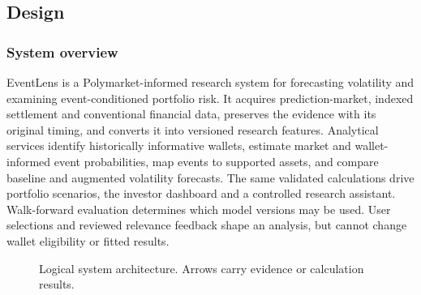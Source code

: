 \subsection{Design}
\subsubsection{System overview}
EventLens is a Polymarket-informed research system for forecasting volatility and examining event-conditioned portfolio risk. It acquires prediction-market, indexed settlement and conventional financial data, preserves the evidence with its original timing, and converts it into versioned research features. Analytical services identify historically informative wallets, estimate market and wallet-informed event probabilities, map events to supported assets, and compare baseline and augmented volatility forecasts. The same validated calculations drive portfolio scenarios, the investor dashboard and a controlled research assistant. Walk-forward evaluation determines which model versions may be used. User selections and reviewed relevance feedback shape an analysis, but cannot change wallet eligibility or fitted results.

\begin{figure}[H]
\centering

\caption{Logical system architecture. Arrows carry evidence or calculation results.}
\label{fig:logical-architecture}
\end{figure}

